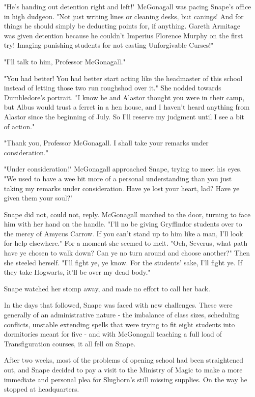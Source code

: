 "He's handing out detention right and left!" McGonagall was pacing Snape's office in high dudgeon. "Not just writing lines or cleaning desks, but canings! And for things he should simply be deducting points for, if anything. Gareth Armitage was given detention because he couldn't Imperius Florence Murphy on the first try! Imaging punishing students for not casting Unforgivable Curses!"

"I'll talk to him, Professor McGonagall."

"You had better! You had better start acting like the headmaster of this school instead of letting those two run roughshod over it." She nodded towards Dumbledore's portrait. "I know he and Alastor thought you were in their camp, but Albus would trust a ferret in a hen house, and I haven't heard anything from Alastor since the beginning of July. So I'll reserve my judgment until I see a bit of action."

"Thank you, Professor McGonagall. I shall take your remarks under consideration."

"Under consideration!" McGonagall approached Snape, trying to meet his eyes. "We used to have a wee bit more of a personal understanding than you just taking my remarks under consideration. Have ye lost your heart, lad? Have ye given them your soul?"

Snape did not, could not, reply. McGonagall marched to the door, turning to face him with her hand on the handle. "I'll no be giving Gryffindor students over to the mercy of Amycus Carrow. If you can't stand up to him like a man, I'll look for help elsewhere." For a moment she seemed to melt. "Och, Severus, what path have ye chosen to walk down? Can ye no turn around and choose another?" Then she steeled herself. "I'll fight ye, ye know. For the students' sake, I'll fight ye. If they take Hogwarts, it'll be over my dead body."

Snape watched her stomp away, and made no effort to call her back.

In the days that followed, Snape was faced with new challenges. These were generally of an administrative nature - the imbalance of class sizes, scheduling conflicts, unstable extending spells that were trying to fit eight students into dormitories meant for five - and with McGonagall teaching a full load of Transfiguration courses, it all fell on Snape.

After two weeks, most of the problems of opening school had been straightened out, and Snape decided to pay a visit to the Ministry of Magic to make a more immediate and personal plea for Slughorn's still missing supplies. On the way he stopped at headquarters.

